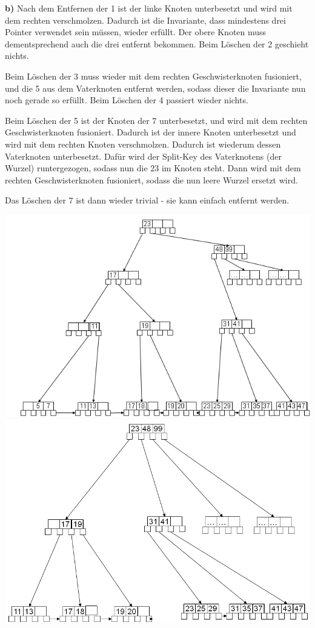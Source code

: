 \documentclass[12pt]{article}
\begin{document}
\textbf{b)} Nach dem Entfernen der 1 ist der linke Knoten unterbesetzt und wird
mit dem rechten verschmolzen. Dadurch ist die Invariante, dass mindestens drei
Pointer verwendet sein müssen, wieder erfüllt. Der obere Knoten muss
dementsprechend auch die drei entfernt bekommen. Beim Löschen der 2 geschieht
nichts.

Beim Löschen der 3 muss wieder mit dem rechten Geschwisterknoten
fusioniert, und die 5 aus dem Vaterknoten entfernt werden, sodass dieser die
Invariante nun noch gerade so erfüllt. Beim Löschen der 4 passiert wieder
nichts.

Beim Löschen der 5 ist der Knoten der 7 unterbesetzt, und wird mit dem
rechten Geschwisterknoten fusioniert. Dadurch ist der innere Knoten unterbesetzt
und wird mit dem rechten Knoten verschmolzen. Dadurch ist wiederum dessen
Vaterknoten unterbesetzt. Dafür wird der Split-Key des Vaterknotens (der Wurzel)
runtergezogen, sodass nun die 23 im Knoten steht. Dann wird mit dem rechten
Geschwisterknoten fusioniert, sodass die nun leere Wurzel ersetzt wird.

Das Löschen der 7 ist dann wieder trivial - sie kann
einfach entfernt werden.
\begin{center}
    \includegraphics{delete_4.PNG}
    \includegraphics{delete_7.PNG}
\end{center}
\end{document}
